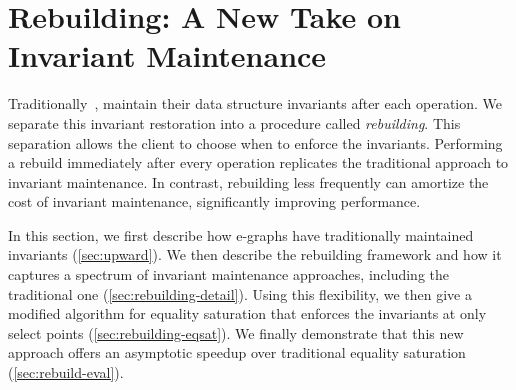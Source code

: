 \chapter{Rebuilding: A New Take on \Egraph Invariant Maintenance}
\label{sec:rebuild}
\label{sec:rebuilding}

Traditionally~\cite{nelson, simplify},
  \egraphs maintain their data structure invariants
  after each operation.
We separate this invariant restoration into a procedure called \textit{rebuilding}.
This separation allows the client to
  choose when to enforce the \egraph invariants.
Performing a rebuild immediately after every operation replicates the
  traditional approach to invariant maintenance.
In contrast, rebuilding less frequently can amortize the cost of invariant
  maintenance, significantly improving performance.

In this section, we first describe how e-graphs have
  traditionally maintained invariants (\autoref{sec:upward}).
We then describe the rebuilding framework and how it captures a spectrum of
  invariant maintenance approaches, including the traditional one
  (\autoref{sec:rebuilding-detail}).
Using this flexibility, we then give a modified algorithm for equality
  saturation that enforces the \egraph invariants at only select points
  (\autoref{sec:rebuilding-eqsat}).
We finally demonstrate that this new approach offers an asymptotic speedup over
  traditional equality saturation (\autoref{sec:rebuild-eval}).






